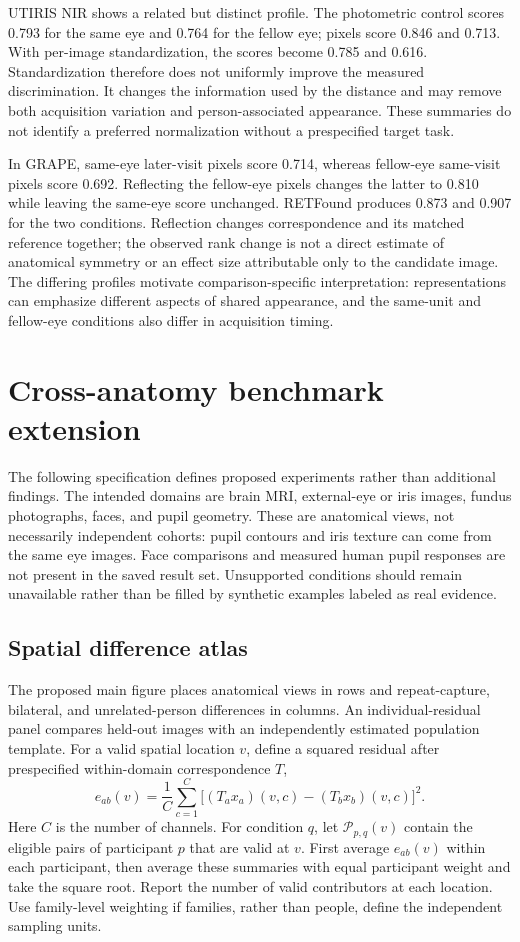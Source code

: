 \documentclass[10pt,twocolumn,letterpaper]{article}
\begin{document}
UTIRIS NIR shows a related but distinct profile. The photometric control scores 0.793 for the same eye and 0.764 for the fellow eye; pixels score 0.846 and 0.713. With per-image standardization, the scores become 0.785 and 0.616. Standardization therefore does not uniformly improve the measured discrimination. It changes the information used by the distance and may remove both acquisition variation and person-associated appearance. These summaries do not identify a preferred normalization without a prespecified target task.

In GRAPE, same-eye later-visit pixels score 0.714, whereas fellow-eye same-visit pixels score 0.692. Reflecting the fellow-eye pixels changes the latter to 0.810 while leaving the same-eye score unchanged. RETFound produces 0.873 and 0.907 for the two conditions. Reflection changes correspondence and its matched reference together; the observed rank change is not a direct estimate of anatomical symmetry or an effect size attributable only to the candidate image. The differing profiles motivate comparison-specific interpretation: representations can emphasize different aspects of shared appearance, and the same-unit and fellow-eye conditions also differ in acquisition timing.

\section{Cross-anatomy benchmark extension}
\label{sec:extension}
The following specification defines proposed experiments rather than additional findings. The intended domains are brain MRI, external-eye or iris images, fundus photographs, faces, and pupil geometry. These are anatomical views, not necessarily independent cohorts: pupil contours and iris texture can come from the same eye images. Face comparisons and measured human pupil responses are not present in the saved result set. Unsupported conditions should remain unavailable rather than be filled by synthetic examples labeled as real evidence.

\subsection{Spatial difference atlas}
The proposed main figure places anatomical views in rows and repeat-capture, bilateral, and unrelated-person differences in columns. An individual-residual panel compares held-out images with an independently estimated population template. For a valid spatial location $v$, define a squared residual after prespecified within-domain correspondence $T$,
\begin{equation}
e_{ab}(v)=\frac{1}{C}\sum_{c=1}^{C}
\big[(T_a x_a)(v,c)-(T_b x_b)(v,c)\big]^2.
\label{eq:spatial}
\end{equation}
Here $C$ is the number of channels. For condition $q$, let $\mathcal{P}_{p,q}(v)$ contain the eligible pairs of participant $p$ that are valid at $v$. First average $e_{ab}(v)$ within each participant, then average these summaries with equal participant weight and take the square root. Report the number of valid contributors at each location. Use family-level weighting if families, rather than people, define the independent sampling units.
\end{document}

